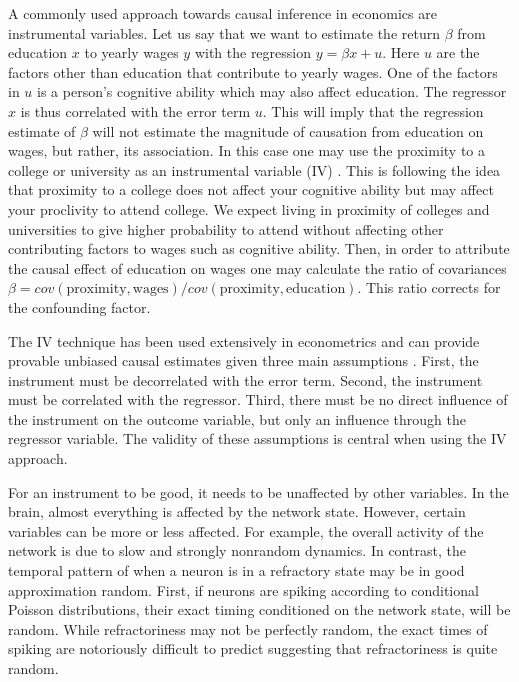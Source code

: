 \documentclass[11pt]{article}
\begin{document}
A commonly used approach towards causal inference in economics are instrumental variables. 
Let us say that we want to estimate the return $ \beta $ from education $ x $ to yearly wages $ y $ with the regression $ y = \beta x + u $. 
Here $ u $ are the factors other than education that contribute to yearly wages. 
One of the factors in $ u $ is a person's cognitive ability which may also affect education. The regressor $ x $  is thus correlated with the error term $ u $. 
This will imply that the regression estimate of $ \beta $ will not estimate the magnitude of causation from education on wages, but rather, its association. 
In this case one may use the proximity to a college or university as an instrumental variable (IV) \citep{card1993using}. 
This is following the idea that proximity to a college does not affect your cognitive ability but may affect your proclivity to attend college.
We expect living in proximity of colleges and universities to give higher probability to attend without affecting other contributing factors to wages such as cognitive ability. 
Then, in order to attribute the causal effect of education on wages one may calculate the ratio of covariances $ \beta = cov(\mathrm{proximity},\mathrm{wages})/cov(\mathrm{proximity},\mathrm{education})$. 
This ratio corrects for the confounding factor.

The IV technique has been used extensively in econometrics and can provide provable unbiased causal estimates given three main assumptions \citep{angrist2008mostly}. 
First, the instrument must be decorrelated with the error term. 
Second, the instrument must be correlated with the regressor. 
Third, there must be no direct influence of the instrument on the outcome variable, but only an influence through the regressor variable. 
The validity of these assumptions is central when using the IV approach.

For an instrument to be good, it needs to be unaffected by other variables. 
In the brain, almost everything is affected by the network state. 
However, certain variables can be more or less affected. 
For example, the overall activity of the network is due to slow and strongly nonrandom dynamics. 
In contrast, the temporal pattern of when a neuron is in a refractory state may be in good approximation random. 
First, if neurons are spiking according to conditional Poisson distributions, their exact timing conditioned on the network state, will be random. 
While refractoriness may not be perfectly random, the exact times of spiking are notoriously difficult to predict \citep{stevenson2008inferring} suggesting that refractoriness is quite random.
\end{document}
